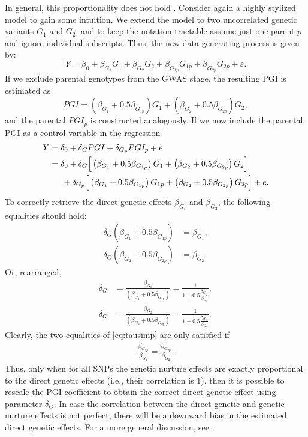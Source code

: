 \documentclass[12pt,a4paper]{article}
\begin{document}
\begin{bibunit}
In general, this proportionality does not hold \citep{Trejo2019}. Consider again a highly stylized model to gain some intuition. We extend the model to two uncorrelated genetic variants $G_1$ and $G_2$, and to keep the notation tractable assume just one parent $p$ and ignore individual subscripts. Thus, the new data generating process is given by:
\begin{equation} \label{eq:dgp2}
 Y = \beta_0 + \beta_{G_1} G_1 + \beta_{G_2} G_2 + \beta_{G_{1p}} G_{1p} + \beta_{G_{2p}} G_{2p} + \varepsilon.
\end{equation}
If we exclude parental genotypes from the GWAS stage, the resulting PGI is estimated as
\begin{equation} \label{eq:pgi2}
 PGI = \left(\beta_{G_1} + 0.5 \beta_{G_{1p}} \right) G_1 + \left(\beta_{G_2} + 0.5 \beta_{G_{2p}}\right) G_2,
\end{equation}
and the parental $PGI_p$ is constructed analogously. If we now include the parental PGI as a control variable in the regression
\begin{align}
 Y &= \delta_0 + \delta_G PGI + \delta_{G_p} PGI_p + e \nonumber\\
 &= \delta_0 + \delta_G \Big[\left(\beta_{G_1} + 0.5 \beta_{G_{1p}} \right) G_1 + \left(\beta_{G_2} + 0.5 \beta_{G_{2p}}\right) G_2 \Big] \nonumber \\
 &\indent + \delta_{G_p} \Big[\left(\beta_{G_1} + 0.5 \beta_{G_{1p}} \right) G_{1p} + \left(\beta_{G_2} + 0.5 \beta_{G_{2p}}\right) G_{2p} \Big] + e.
\end{align}
To correctly retrieve the direct genetic effects $\beta_{G_1}$ and $\beta_{G_2}$, the following equalities should hold:
\begin{align}
\delta_G \left(\beta_{G_1} + 0.5 \beta_{G_{1p}}\right) & = \beta_{G_1}, \nonumber\\
\delta_G \left(\beta_{G_2} + 0.5 \beta_{G_{2p}}\right) &= \beta_{G_2}. 
\end{align}
Or, rearranged, 
\begin{align} \label{eq:tausimp}
\delta_G &= \frac{\beta_{G_1}}{\left(\beta_{G_1} + 0.5\beta_{G_{1p}}\right)} = \frac{1}{1 + 0.5 \frac{\beta_{G_{1p}}}{\beta_{G_1}}},  \nonumber\\
\delta_G &= \frac{\beta_{G_2}}{\left(\beta_{G_2} + 0.5 \beta_{G_{2p}}\right)} = \frac{1}{1+0.5 \frac{\beta_{G_{2p}}}{\beta_{G_2}}}.
\end{align}
Clearly, the two equalities of \autoref{eq:tausimp} are only satisfied if 
\begin{align}
\frac{\beta_{G_{1p}}}{\beta_{G_1}} = \frac{\beta_{G_{2p}}}{\beta_{G_2}}.
\end{align}
Thus, only when for all SNPs the genetic nurture effects are exactly proportional to the direct genetic effects (i.e., their correlation is 1), then it is possible to rescale the PGI coefficient to obtain the correct direct genetic effect using parameter $\delta_G$. In case the correlation between the direct genetic and genetic nurture effects is not perfect, there will be a downward bias in the estimated direct genetic effects. For a more general discussion, see \cite{Trejo2019}. 


\end{bibunit}
\end{document}
